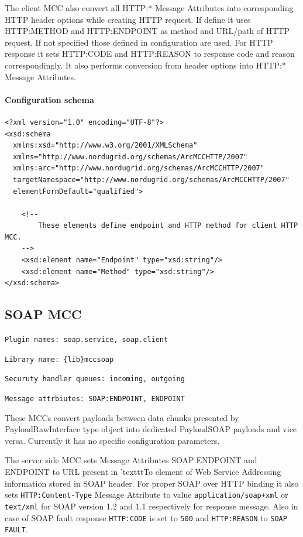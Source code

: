 \documentclass{book}
\begin{document}
The client MCC also convert all HTTP:* Message Attributes into corresponding HTTP header options while creating HTTP request. If define it uses HTTP:METHOD and HTTP:ENDPOINT as method and URL/path of HTTP request. If not specified those defined in configuration are used. For HTTP response it sets HTTP:CODE and HTTP:REASON to response code and reason correspondingly. It also performs conversion from header options into HTTP:* Message Attributes.

\paragraph{Configuration schema}

\begin{verbatim}
<?xml version="1.0" encoding="UTF-8"?>
<xsd:schema
  xmlns:xsd="http://www.w3.org/2001/XMLSchema"
  xmlns="http://www.nordugrid.org/schemas/ArcMCCHTTP/2007"
  xmlns:arc="http://www.nordugrid.org/schemas/ArcMCCHTTP/2007"
  targetNamespace="http://www.nordugrid.org/schemas/ArcMCCHTTP/2007"
  elementFormDefault="qualified">

    <!--
        These elements define endpoint and HTTP method for client HTTP MCC.
    -->
    <xsd:element name="Endpoint" type="xsd:string"/>
    <xsd:element name="Method" type="xsd:string"/>
</xsd:schema>
\end{verbatim}


\subsection{SOAP MCC}

\texttt{Plugin names: soap.service, soap.client}

\texttt{Library name: \{lib\}mccsoap}

\texttt{Securuty handler queues: incoming, outgoing}

\texttt{Message attrbiutes: SOAP:ENDPOINT, ENDPOINT}


These MCCs convert payloads between data chunks presented by PayloadRawInterface type object into dedicated PayloadSOAP payloads and vice versa. Currently it has no specific configuration parameters.

The server side MCC sets Message Attributes SOAP:ENDPOINT and ENDPOINT to URL present in 'texttt{To} element of Web Service Addressing information stored in SOAP header. For proper SOAP over HTTP binding it also sets \texttt{HTTP:Content-Type} Message Attribute to value \texttt{application/soap+xml} or \texttt{text/xml} for SOAP version 1.2 and 1.1 respectively for response message. Also in case of SOAP fault response \texttt{HTTP:CODE} is set to \texttt{500} and \texttt{HTTP:REASON} to \texttt{SOAP FAULT}.
\end{document}
